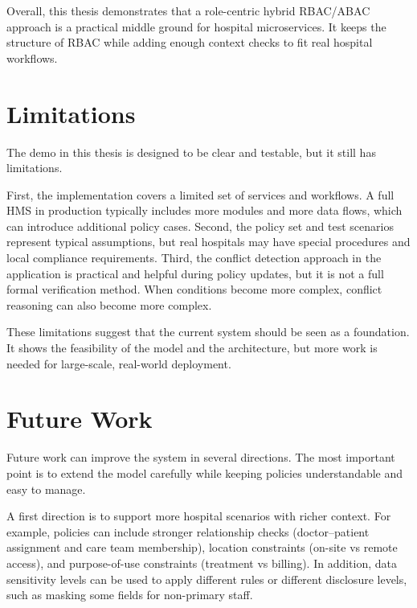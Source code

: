Overall, this thesis demonstrates that a role-centric hybrid RBAC/ABAC approach is a practical middle ground for hospital
microservices. It keeps the structure of RBAC while adding enough context checks to fit real hospital workflows.
\vspace{0.5cm}


\section{Limitations}
\label{sec:limitations}
The demo in this thesis is designed to be clear and testable, but it still has limitations.
\vspace{0.5cm}


First, the implementation covers a limited set of services and workflows. A full HMS in production typically includes more
modules and more data flows, which can introduce additional policy cases. Second, the policy set and test scenarios represent
typical assumptions, but real hospitals may have special procedures and local compliance requirements. Third, the conflict
detection approach in the application is practical and helpful during policy updates, but it is not a full formal verification
method. When conditions become more complex, conflict reasoning can also become more complex.
\vspace{0.5cm}


These limitations suggest that the current system should be seen as a foundation. It shows the feasibility of the model and
the architecture, but more work is needed for large-scale, real-world deployment.

\section{Future Work}
\label{sec:future_work}
Future work can improve the system in several directions. The most important point is to extend the model carefully while
keeping policies understandable and easy to manage.
\vspace{0.5cm}


A first direction is to support more hospital scenarios with richer context. For example, policies can include stronger
relationship checks (doctor--patient assignment and care team membership), location constraints (on-site vs remote access),
and purpose-of-use constraints (treatment vs billing). In addition, data sensitivity levels can be used to apply different
rules or different disclosure levels, such as masking some fields for non-primary staff.
\vspace{0.5cm}


